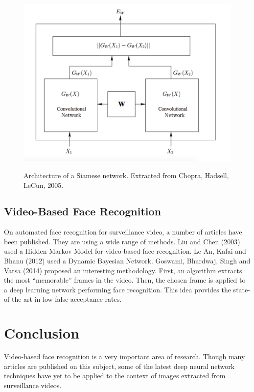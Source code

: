 \begin{itemize}
\begin{figure}[!ht]
  \centering
  \includegraphics[scale=0.4]{figures/siamese.png}  
  \caption[Architecture of a Siamese network. Extracted from Chopra, Hadsell, LeCun, 2005.]{Architecture of a Siamese network. Extracted from Chopra, Hadsell, LeCun, 2005.}
  \protect\label{fig:Siamese}
\end{figure}
\FloatBarrier
\end{itemize}


\subsection{Video-Based Face Recognition}

On automated face recognition for surveillance video, a number of articles have been published. They are using a wide range of methods. Liu and Chen (2003) used a Hidden Markov Model for video-based face recognition. Le An, Kafai and Bhanu (2012) used a Dynamic Bayesian Network. Goswami, Bhardwaj, Singh and Vatsa (2014) proposed an interesting methodology. First, an algorithm extracts the most \enquote{memorable} frames in the video. Then, the chosen frame is applied to a deep learning network performing face recognition. This idea provides the state-of-the-art in low false acceptance rates.

\section{Conclusion}

Video-based face recognition is a very important area of research. Though many articles are published on this subject, some of the latest deep neural network techniques have yet to be applied to the context of images extracted from surveillance videos.